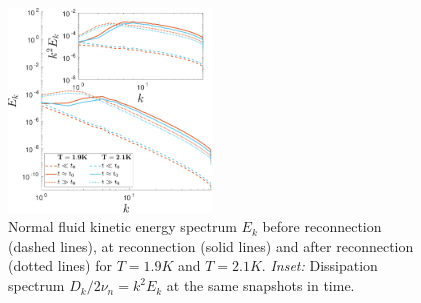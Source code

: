 \documentclass[%
 reprint,
 amsmath,amssymb,
 aps,
 prl,
]{revtex4-2}
\begin{document}
\begin{figure}[b]
    \centering
    \includegraphics*[width=0.48\textwidth]{energy-spec.pdf}
    \caption{Normal fluid kinetic energy spectrum $E_k$ before reconnection (dashed lines), at reconnection (solid lines) and after reconnection (dotted lines) for $T=1.9K$ and $T=2.1K$. \emph{Inset:} Dissipation spectrum $D_k/2\nu_n=k^2 E_k$ at the same snapshots in time.}
    \label{fig:kinetic-energy}
\end{figure}
\end{document}

